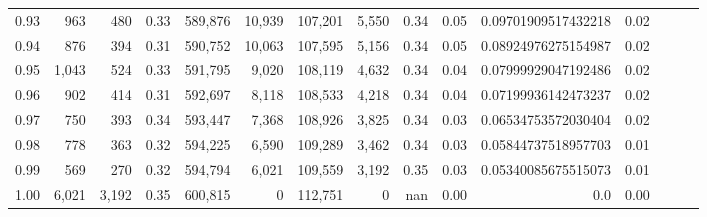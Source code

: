 \begin{tabular}{rrrrrrrrrrrrrrr}
0.93 &     963 &    480 &  0.33 &  589,876 &   10,939 &  107,201 &    5,550 &  0.34 &  0.05 &  0.09701909517432218 &      0.02 \\
0.94 &     876 &    394 &  0.31 &  590,752 &   10,063 &  107,595 &    5,156 &  0.34 &  0.05 &  0.08924976275154987 &      0.02 \\
0.95 &   1,043 &    524 &  0.33 &  591,795 &    9,020 &  108,119 &    4,632 &  0.34 &  0.04 &  0.07999929047192486 &      0.02 \\
0.96 &     902 &    414 &  0.31 &  592,697 &    8,118 &  108,533 &    4,218 &  0.34 &  0.04 &  0.07199936142473237 &      0.02 \\
0.97 &     750 &    393 &  0.34 &  593,447 &    7,368 &  108,926 &    3,825 &  0.34 &  0.03 &  0.06534753572030404 &      0.02 \\
0.98 &     778 &    363 &  0.32 &  594,225 &    6,590 &  109,289 &    3,462 &  0.34 &  0.03 &  0.05844737518957703 &      0.01 \\
0.99 &     569 &    270 &  0.32 &  594,794 &    6,021 &  109,559 &    3,192 &  0.35 &  0.03 &  0.05340085675515073 &      0.01 \\
1.00 &   6,021 &  3,192 &  0.35 &  600,815 &        0 &  112,751 &        0 &   nan &  0.00 &                  0.0 &      0.00 \\
\bottomrule
\end{tabular}
